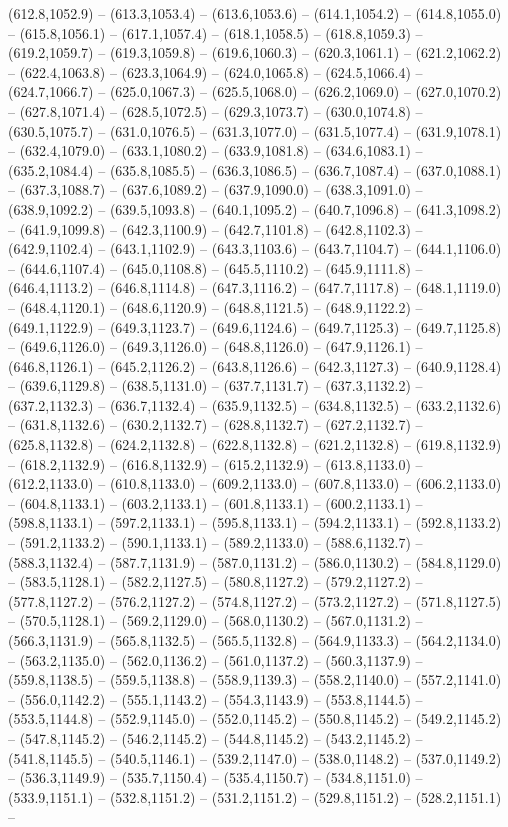 (612.8,1052.9) -- (613.3,1053.4) -- (613.6,1053.6) -- (614.1,1054.2) -- (614.8,1055.0) -- (615.8,1056.1) -- (617.1,1057.4) -- (618.1,1058.5) -- (618.8,1059.3) -- (619.2,1059.7) -- (619.3,1059.8) -- (619.6,1060.3) -- (620.3,1061.1) -- (621.2,1062.2) -- (622.4,1063.8) -- (623.3,1064.9) -- (624.0,1065.8) -- (624.5,1066.4) -- (624.7,1066.7) -- (625.0,1067.3) -- (625.5,1068.0) -- (626.2,1069.0) -- (627.0,1070.2) -- (627.8,1071.4) -- (628.5,1072.5) -- (629.3,1073.7) -- (630.0,1074.8) -- (630.5,1075.7) -- (631.0,1076.5) -- (631.3,1077.0) -- (631.5,1077.4) -- (631.9,1078.1) -- (632.4,1079.0) -- (633.1,1080.2) -- (633.9,1081.8) -- (634.6,1083.1) -- (635.2,1084.4) -- (635.8,1085.5) -- (636.3,1086.5) -- (636.7,1087.4) -- (637.0,1088.1) -- (637.3,1088.7) -- (637.6,1089.2) -- (637.9,1090.0) -- (638.3,1091.0) -- (638.9,1092.2) -- (639.5,1093.8) -- (640.1,1095.2) -- (640.7,1096.8) -- (641.3,1098.2) -- (641.9,1099.8) -- (642.3,1100.9) -- (642.7,1101.8) -- (642.8,1102.3) -- (642.9,1102.4) -- (643.1,1102.9) -- (643.3,1103.6) -- (643.7,1104.7) -- (644.1,1106.0) -- (644.6,1107.4) -- (645.0,1108.8) -- (645.5,1110.2) -- (645.9,1111.8) -- (646.4,1113.2) -- (646.8,1114.8) -- (647.3,1116.2) -- (647.7,1117.8) -- (648.1,1119.0) -- (648.4,1120.1) -- (648.6,1120.9) -- (648.8,1121.5) -- (648.9,1122.2) -- (649.1,1122.9) -- (649.3,1123.7) -- (649.6,1124.6) -- (649.7,1125.3) -- (649.7,1125.8) -- (649.6,1126.0) -- (649.3,1126.0) -- (648.8,1126.0) -- (647.9,1126.1) -- (646.8,1126.1) -- (645.2,1126.2) -- (643.8,1126.6) -- (642.3,1127.3) -- (640.9,1128.4) -- (639.6,1129.8) -- (638.5,1131.0) -- (637.7,1131.7) -- (637.3,1132.2) -- (637.2,1132.3) -- (636.7,1132.4) -- (635.9,1132.5) -- (634.8,1132.5) -- (633.2,1132.6) -- (631.8,1132.6) -- (630.2,1132.7) -- (628.8,1132.7) -- (627.2,1132.7) -- (625.8,1132.8) -- (624.2,1132.8) -- (622.8,1132.8) -- (621.2,1132.8) -- (619.8,1132.9) -- (618.2,1132.9) -- (616.8,1132.9) -- (615.2,1132.9) -- (613.8,1133.0) -- (612.2,1133.0) -- (610.8,1133.0) -- (609.2,1133.0) -- (607.8,1133.0) -- (606.2,1133.0) -- (604.8,1133.1) -- (603.2,1133.1) -- (601.8,1133.1) -- (600.2,1133.1) -- (598.8,1133.1) -- (597.2,1133.1) -- (595.8,1133.1) -- (594.2,1133.1) -- (592.8,1133.2) -- (591.2,1133.2) -- (590.1,1133.1) -- (589.2,1133.0) -- (588.6,1132.7) -- (588.3,1132.4) -- (587.7,1131.9) -- (587.0,1131.2) -- (586.0,1130.2) -- (584.8,1129.0) -- (583.5,1128.1) -- (582.2,1127.5) -- (580.8,1127.2) -- (579.2,1127.2) -- (577.8,1127.2) -- (576.2,1127.2) -- (574.8,1127.2) -- (573.2,1127.2) -- (571.8,1127.5) -- (570.5,1128.1) -- (569.2,1129.0) -- (568.0,1130.2) -- (567.0,1131.2) -- (566.3,1131.9) -- (565.8,1132.5) -- (565.5,1132.8) -- (564.9,1133.3) -- (564.2,1134.0) -- (563.2,1135.0) -- (562.0,1136.2) -- (561.0,1137.2) -- (560.3,1137.9) -- (559.8,1138.5) -- (559.5,1138.8) -- (558.9,1139.3) -- (558.2,1140.0) -- (557.2,1141.0) -- (556.0,1142.2) -- (555.1,1143.2) -- (554.3,1143.9) -- (553.8,1144.5) -- (553.5,1144.8) -- (552.9,1145.0) -- (552.0,1145.2) -- (550.8,1145.2) -- (549.2,1145.2) -- (547.8,1145.2) -- (546.2,1145.2) -- (544.8,1145.2) -- (543.2,1145.2) -- (541.8,1145.5) -- (540.5,1146.1) -- (539.2,1147.0) -- (538.0,1148.2) -- (537.0,1149.2) -- (536.3,1149.9) -- (535.7,1150.4) -- (535.4,1150.7) -- (534.8,1151.0) -- (533.9,1151.1) -- (532.8,1151.2) -- (531.2,1151.2) -- (529.8,1151.2) -- (528.2,1151.1) -- 
